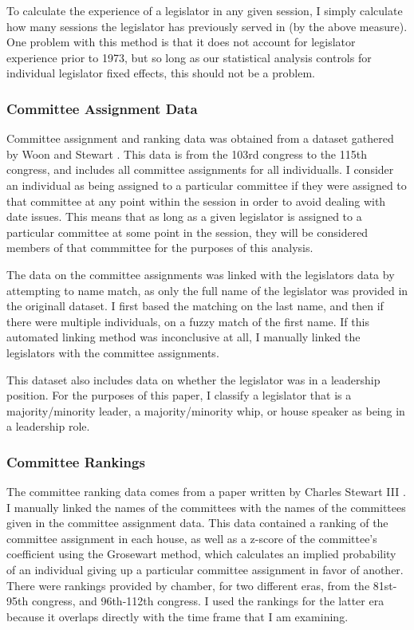 \documentclass{article}
\begin{document}
To calculate the experience of a legislator in any given session, I simply calculate how many sessions the legislator has previously served in (by the above measure). One problem with this method is that it does not account for legislator experience prior to 1973, but so long as our statistical analysis controls for individual legislator fixed effects, this should not be a problem. 

\subsubsection{Committee Assignment Data}
Committee assignment and ranking data was obtained from a dataset gathered by Woon and Stewart \cite{stewart-committee-assignments}. This data is from the 103rd congress to the 115th congress, and includes all committee assignments for all individualls. I consider an individual as being assigned to a particular committee if they were assigned to that committee at any point within the session in order to avoid dealing with date issues. This means that as long as a given legislator is assigned to a particular committee at some point in the session, they will be considered members of that commmittee for the purposes of this analysis. 


The data on the committee assignments was linked with the legislators data by attempting to name match, as only the full name of the legislator was provided in the originall dataset. I first based the matching on the last name, and then if there were multiple individuals, on a fuzzy match of the first name. If this automated linking method was inconclusive at all, I manually linked the legislators with the committee assignments. 

This dataset also includes data on whether the legislator was in a leadership position. For the purposes of this paper, I classify a legislator that is a majority/minority leader, a majority/minority whip, or house speaker as being in a leadership role. 

\subsubsection{Committee Rankings}
The committee ranking data comes from a paper written by Charles Stewart III \cite{stewart-committee-values}. I manually linked the names of the committees with the names of the committees given in the committee assignment data. This data contained a ranking of the committee assignment in each house, as well as a z-score of the committee's coefficient using the Grosewart method, which calculates an implied probability of an individual giving up a particular committee assignment in favor of another. There were rankings provided by chamber, for two different eras, from the 81st-95th congress, and 96th-112th congress. I used the rankings for the latter era because it overlaps directly with the time frame that I am examining.
\end{document}
